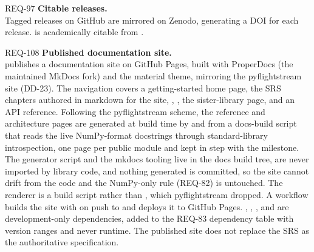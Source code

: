 \begin{reqbox}{REQ-97}{\draft}
\textbf{Citable releases.}\\
Tagged releases on GitHub are mirrored on Zenodo, generating a DOI for
each release. \itc{} is academically citable from .
\end{reqbox}

\begin{reqbox}{REQ-108}{\draft}
\textbf{Published documentation site.}\\
\itc{} publishes a documentation site on GitHub Pages, built with
ProperDocs (the maintained MkDocs fork) and the material theme,
mirroring the pyflightstream site (DD-23). The navigation covers a
getting-started home page, the SRS chapters authored in markdown for
the site, , , the
sister-library page, and an API reference. Following the pyflightstream
scheme, the reference and architecture pages are generated at build
time by  and  from a
docs-build script that reads the live NumPy-format docstrings through
standard-library introspection, one page per public module and kept in
step with the milestone. The generator script and the mkdocs tooling
live in the docs build tree, are never imported by library code, and
nothing generated is committed, so the site cannot drift from the code
and the NumPy-only rule (REQ-82) is untouched. The renderer is a build
script rather than , which pyflightstream dropped. A
 workflow builds the site with  on push
to  and deploys it to GitHub Pages. ,
, , and
 are development-only dependencies, added to
the REQ-83 dependency table with version ranges and never runtime. The
published site does not replace the SRS as the authoritative
specification.
\end{reqbox}
